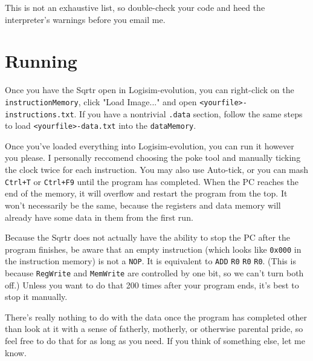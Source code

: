 \documentclass[12pt, oneside]{memoir}
\newcommand{\R}[1]{{\color{register}\texttt{R#1}}}
\newcommand{\instruction}[1]{{\color{instruction}\texttt{#1}}}
\newcommand{\header}[1]{{\color{header}\texttt{#1}}}
\begin{document}
This is not an exhaustive list, so double-check your code and heed the interpreter's warnings before you email me.



\chapter{Running}
Once you have the Sqrtr open in Logisim-evolution, you can right-click on the \texttt{instructionMemory}, click "Load Image..." and open \texttt{<yourfile>-instructions.txt}. If you have a nontrivial \header{.data} section, follow the same steps to load \texttt{<yourfile>-data.txt} into the \texttt{dataMemory}.

Once you've loaded everything into Logisim-evolution, you can run it however you please. I personally reccomend choosing the poke tool and manually ticking the clock twice for each instruction. You may also use Auto-tick, or you can mash \texttt{Ctrl+T} or \texttt{Ctrl+F9} until the program has completed. When the PC reaches the end of the memory, it will overflow and restart the program from the top. It won't necessarily be the same, because the registers and data memory will already have some data in them from the first run. 

Because the Sqrtr does not actually have the ability to stop the PC after the program finishes, be aware that an empty instruction (which looks like \texttt{0x000} in the instruction memory) is not a \instruction{NOP}. It is equivalent to \instruction{ADD} \R{0} \R{0} \R{0}. (This is because \texttt{RegWrite} and \texttt{MemWrite} are controlled by one bit, so we can't turn both off.) Unless you want to do that 200 times after your program ends, it's best to stop it manually.

There's really nothing to do with the data once the program has completed other than look at it with a sense of fatherly, motherly, or otherwise parental pride, so feel free to do that for as long as you need. If you think of something else, let me know.
\end{document}
